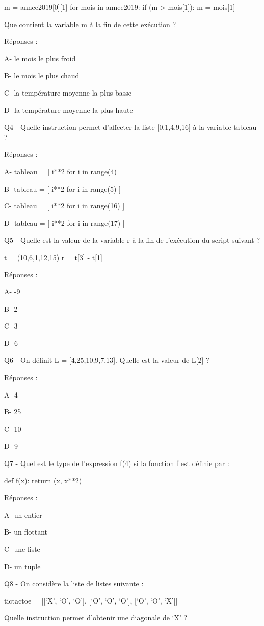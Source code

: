 \documentclass[
]{book}
\begin{document}
m = annee2019{[}0{]}{[}1{]}
for mois in annee2019:
if (m \textgreater{} mois{[}1{]}):
m = mois{[}1{]}

Que contient la variable m à la fin de cette exécution ?

Réponses :

A- le mois le plus froid

B- le mois le plus chaud

C- la température moyenne la plus basse

D- la température moyenne la plus haute

Q4 - Quelle instruction permet d'affecter la liste {[}0,1,4,9,16{]} à la variable tableau ?

Réponses :

A- tableau = {[} i**2 for i in range(4) {]}

B- tableau = {[} i**2 for i in range(5) {]}

C- tableau = {[} i**2 for i in range(16) {]}

D- tableau = {[} i**2 for i in range(17) {]}

Q5 - Quelle est la valeur de la variable r à la fin de l'exécution du script suivant ?

t = (10,6,1,12,15)
r = t{[}3{]} - t{[}1{]}

Réponses :

A- -9

B- 2

C- 3

D- 6

Q6 - On définit L = {[}4,25,10,9,7,13{]}. Quelle est la valeur de L{[}2{]} ?

Réponses :

A- 4

B- 25

C- 10

D- 9

Q7 - Quel est le type de l'expression f(4) si la fonction f est définie par :

def f(x):
return (x, x**2)

Réponses :

A- un entier

B- un flottant

C- une liste

D- un tuple

Q8 - On considère la liste de listes suivante :

tictactoe = {[}{[}`X', `O', `O'{]},
{[}`O', `O', `O'{]},
{[}`O', `O', `X'{]}{]}

Quelle instruction permet d'obtenir une diagonale de `X' ?
\end{document}
